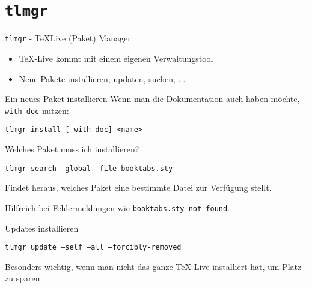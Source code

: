 \section{\texttt{tlmgr}}

\begin{frame}[fragile]{
  \texttt{tlmgr} - \TeX Live (Paket) Manager
}
  \begin{itemize}
    \item \TeX-Live kommt mit einem eigenen Verwaltungstool
    \item Neue Pakete installieren, updaten, suchen, ...
  \end{itemize}

  \begin{block}{Ein neues Paket installieren}
    Wenn man die Dokumentation auch haben möchte, \texttt{--with-doc} nutzen:
    \begin{center}
      \texttt{tlmgr install [--with-doc] <name>}
    \end{center}
  \end{block}

  \begin{block}{Welches Paket muss ich installieren?}

    \begin{center}
      \texttt{tlmgr search --global --file booktabs.sty}
    \end{center}
    Findet heraus, welches Paket eine bestimmte Datei zur Verfügung stellt.

    Hilfreich bei Fehlermeldungen wie \texttt{booktabs.sty not found}.
  \end{block}

  \begin{block}{Updates installieren}
    \begin{center}
      \texttt{tlmgr update --self --all --forcibly-removed}
    \end{center}
  \end{block}

  Besonders wichtig, wenn man nicht das ganze TeX-Live installiert hat,
  um Platz zu sparen.
\end{frame}
